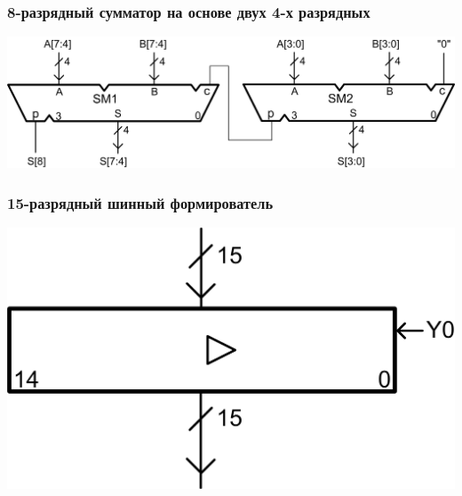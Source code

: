 \begin{frame}
    \frametitle{8-разрядный сумматор на основе двух 4-х разрядных}
    \begin{center}
        \includegraphics[width=.95\textwidth]{fig/summators}
    \end{center}
\end{frame}

\begin{frame}
    \frametitle{15-разрядный шинный формирователь}
    \begin{center}
        \includegraphics{fig/zbuffer}
    \end{center}
\end{frame}


